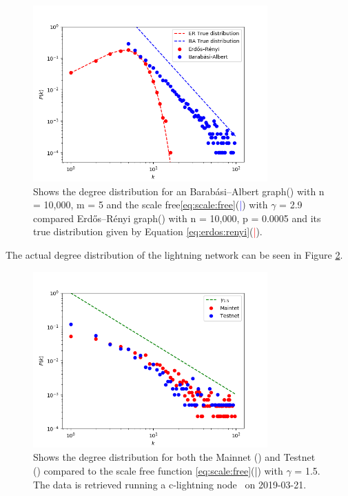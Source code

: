 \begin{figure}[!htb]
	\hspace*{-0.5cm} 
	\centering
	\includegraphics[width=9cm]{images/scale_free_degree_distribution.png}
	\caption{Shows the degree distribution for an Barabási–Albert graph(\tikzcircle[blue, fill=blue]{2pt}) with n = 10,000, m = 5 and the scale free\ref{eq:scale:free}(\textcolor{blue}{|}) with $\gamma$ = 2.9 compared Erdős–Rényi graph(\tikzcircle[red, fill=red]{2pt}) with n = 10,000, p = 0.0005 and its true distribution given by Equation \ref{eq:erdos:renyi}(\textcolor{red}{|}).
	}
	\label{fig:scale_free}
	\hspace*{2mm} 
\end{figure}


The actual degree distribution of the lightning network can be seen in Figure \ref{fig:real_network}.

\begin{figure}[!htb]
	\hspace*{-0.5cm} 
	\centering
	\includegraphics[width=9cm]{images/main-testnet_degree_distribution.png}
	\caption{Shows the degree distribution for both the Mainnet (\tikzcircle[red, fill=red]{2pt}) and Testnet (\tikzcircle[blue, fill=blue]{2pt})
		compared to the scale free function \ref{eq:scale:free}(\textcolor{black}{|}) with $\gamma$ = 1.5. The data is retrieved running a c-lightning node~\cite{repository:clightning} on 2019-03-21.
	}
	\label{fig:real_network}
	\hspace*{2mm}
\end{figure}

